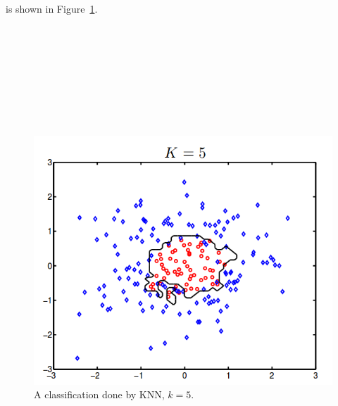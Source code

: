 is shown in Figure~\ref{fig:knn}.\\\\\\\\\\\\\\\\\\
\begin{figure}[h!]
\centering
\includegraphics[scale=0.27]{../Plottar/KNN.png}
\caption{A classification done by KNN, $k = 5$.}
\label{fig:knn}
\end{figure}

